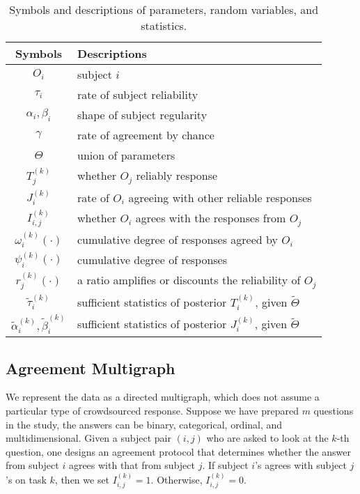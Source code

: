 \documentclass[10pt,journal,letterpaper,compsoc,twoside]{IEEEtran}
\begin{document}
\begin{table}[ht!] 
\caption{Symbols and descriptions of parameters, random variables, and statistics.}
\begin{tabular}{c | l}
\hline
Symbols & Descriptions \\\hline
$O_i$ & subject $i$ \\
$\tau_i$ & rate of subject reliability\\
$\alpha_i,\beta_i$ & shape of subject regularity\\
$\gamma$ & rate of agreement by chance\\
${\Theta}$ & union of parameters \\
$T_j^{(k)}$ & whether $O_j$ reliably response \\
$J_i^{(k)}$ & rate of $O_i$ agreeing with 
other reliable responses \\
$I_{i,j}^{(k)}$ & whether $O_i$ agrees with the responses from $O_j$\\
$\omega_i^{(k)}(\cdot)$ & cumulative degree of
responses agreed by $O_i$ \\
$\psi_i^{(k)}(\cdot)$ & cumulative degree of responses \\
$r_j^{(k)}(\cdot)$ & a ratio amplifies or discounts the reliability of $O_j$\\
$\tilde{\tau}_i^{(k)}$ & sufficient statistics of posterior $T_i^{(k)}$, given $\tilde{\Theta}$\\
$\tilde{\alpha}_i^{(k)},\tilde{\beta}_i^{(k)}$ & 
 sufficient statistics of posterior $J_i^{(k)}$, given $\tilde{\Theta}$\\
\hline
\end{tabular}
\label{tab:symbol}
\end{table}

\subsection{Agreement Multigraph}
We represent the data as a directed multigraph, which does not assume
a particular type of crowdsourced {response}.
Suppose we have prepared $m$ questions in the study, the answers can be binary, 
categorical, ordinal, and multidimensional.
Given a subject pair $(i,j)$ who are asked to look at the 
$k$-th question, one designs an agreement protocol 
that determines whether the answer from subject $i$ agrees with
that from subject $j$. If subject $i$'s agrees with subject $j$'s on task $k$, 
then we set $I_{i,j}^{(k)}=1$. Otherwise, $I_{i,j}^{(k)}=0$.
\end{document}
